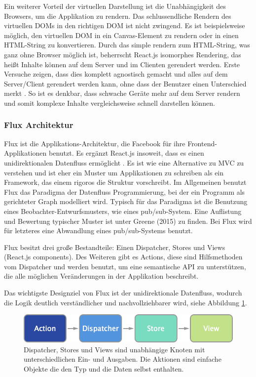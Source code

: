 \documentclass[12pt,twoside]{book}
\begin{document}
Ein weiterer Vorteil der virtuellen Darstellung ist die Unabhängigkeit des Browsers, um die Applikation zu rendern. Das schlussendliche Rendern des virtuellen DOMs in den richtigen DOM ist nicht zwingend. Es ist beispielsweise möglich, den virtuellen DOM in ein Canvas-Element zu rendern oder in einen HTML-String zu konvertieren.
Durch das simple rendern zum HTML-String, was ganz ohne Browser möglich ist, beherrscht React.js isomorphes Rendering, das heißt Inhalte können auf dem Server und im Clienten gerendert werden. Erste Versuche zeigen, dass dies komplett agnostisch gemacht und alles auf dem Server/Client gerendert werden kann, ohne dass der Benutzer einen Unterschied merkt \cite{overblog}. So ist es denkbar, dass schwache Geräte mehr auf dem Server rendern und somit komplexe Inhalte vergleichsweise schnell darstellen können.

\subsubsection*{Flux Architektur}

Flux ist die Applikations-Architektur, die Facebook für ihre Frontend-Applikationen benutzt. Es ergänzt React.js insoweit, dass es einen unidirektionalen Datenfluss ermöglicht \cite{flux}. Es ist wie eine Alternative zu MVC zu verstehen und ist eher ein Muster um Applikationen zu schreiben als ein Framework, das einem rigoros die Struktur vorschreibt. Im Allgemeinen benutzt Flux das Paradigma der Datenfluss Programmierung\cite{johnston2004advances}, bei der ein Programm als gerichteter Graph modelliert wird. Typisch für das Paradigma ist die Benutzung eines Beobachter-Entwurfsmusters, wie eines pub/sub-System. Eine Auflistung und Bewertung typischer Muster ist unter Greene (2015) \citep{signals} zu finden. Bei Flux wird für letzteres eine Abwandlung eines pub/sub-Systems benutzt.

Flux besitzt drei große Bestandteile: Einen Dispatcher, Stores und Views (React.js components). Des Weiteren gibt es Actions, diese sind Hilfsmethoden vom Dispatcher und werden benutzt, um eine semantische API zu unterstützen, die alle möglichen Veränderungen in der Applikation beschreibt.

Das wichtigste Designziel von Flux ist der unidirektionale Datenfluss, wodurch die Logik deutlich verständlicher und nachvollziehbarer wird, siehe Abbildung \ref{fig:flux}.

\begin{figure}[htbp]
    \centering
    \includegraphics[width=1.0\textwidth]{images/flux.png}
    \caption{Dispatcher, Stores und Views sind unabhängige Knoten mit unterschiedlichen Ein- und Ausgaben. Die Aktionen sind einfache Objekte die den Typ und die Daten selbst enthalten.}
    \label{fig:flux}
\end{figure}
\end{document}
